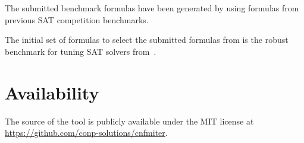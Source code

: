 \documentclass[conference]{IEEEtran}
\begin{document}
The submitted benchmark formulas have been generated by using formulas from previous SAT competition benchmarks.
\newpage

\noindent
The initial set of formulas to select the submitted formulas from is the robust benchmark for tuning SAT solvers from~\cite{SATgauss}.



\section{Availability}

The source of the tool is publicly available under the MIT license at \url{https://github.com/conp-solutions/cnfmiter}.



\end{document}
